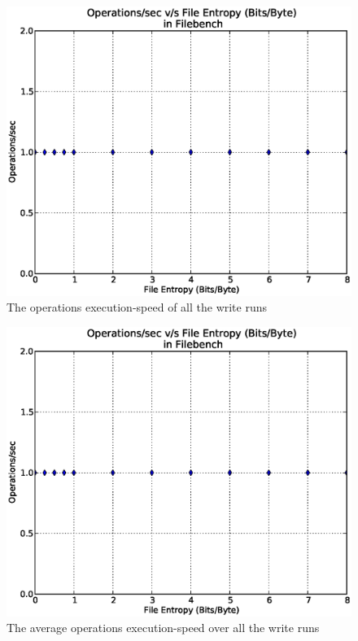 \begin{figure}[H]
\begin{center}
\includegraphics[scale=.55]{../results/set2/write_ops_2.eps}
\caption{The operations execution-speed of all the write runs}
\label{fig:wops2}
\end{center}
\end{figure}


\begin{figure}[H]
\begin{center}
\includegraphics[scale=.55]{../results/set2/write_ops_2.eps}
\caption{The average operations execution-speed over all the write runs}
\label{fig:wopsavg2}
\end{center}
\end{figure}

